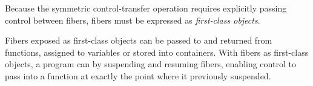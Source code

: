 
Because the symmetric control-transfer operation requires explicitly passing
control between fibers, fibers must be expressed as
\emph{first-class objects}.

Fibers exposed as first-class objects can be passed to and returned from
functions, assigned to variables or stored into containers. With fibers as
first-class objects, a program can  by suspending and resuming fibers, enabling control to pass into a
function at exactly the point where it previously suspended.


